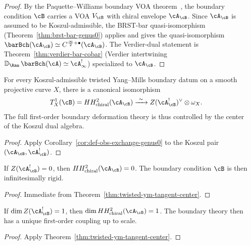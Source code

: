 \begin{proof}
By the Paquette--Williams boundary VOA theorem~{\cite{PW22}}, the boundary condition $\cB$ carries a
VOA $V_{\cB}$ with chiral envelope $\cA_{\cB}$. Since $\cA_{\cB}$ is assumed to be
Koszul-admissible, the BRST-bar quasi-isomorphism (Theorem~\ref{thm:brst-bar-genus0}) applies and gives the quasi-isomorphism
$\barBch(\cA_{\cB}) \simeq C^{\frac{\infty}{2}+\bullet}(\cA_{\cB})$. The Verdier-dual statement is
Theorem~\ref{thm:verdier-bar-cobar} (Verdier intertwining $\mathbb{D}_{\Ran}\, \barBch(\cA) \simeq \cA^!_\infty$) specialized to $\cA_{\cB}$.
\end{proof}

\begin{theorem}
\label{thm:twisted-ym-tangent-center}
For every Koszul-admissible twisted Yang--Mills boundary datum on a smooth projective
curve $X$, there is a canonical isomorphism
\[
T^1_X(\cB)
= HH^2_{\mathrm{chiral}}(\cA_{\cB})
\xrightarrow{\ \sim\ }
Z(\cA_{\cB}^!)^{\vee} \otimes \omega_X.
\]
The full first-order boundary deformation theory is thus controlled by the center
of the Koszul dual algebra.
\end{theorem}

\begin{proof}
Apply Corollary~\ref{cor:def-obs-exchange-genus0} to the Koszul pair
$(\cA_{\cB}, \cA_{\cB}^!)$.
\end{proof}

\begin{corollary}
\label{cor:twisted-ym-center-rigidity}
If $Z(\cA_{\cB}^!) = 0$, then $HH^2_{\mathrm{chiral}}(\cA_{\cB}) = 0$.
The boundary condition $\cB$ is then infinitesimally rigid.
\end{corollary}

\begin{proof}
Immediate from Theorem~\ref{thm:twisted-ym-tangent-center}.
\end{proof}

\begin{corollary}
\label{cor:twisted-ym-one-parameter}
If $\dim Z(\cA_{\cB}^!) = 1$, then $\dim HH^2_{\mathrm{chiral}}(\cA_{\cB}) = 1$.
The boundary theory then has a unique first-order coupling up to scale.
\end{corollary}

\begin{proof}
Apply Theorem~\ref{thm:twisted-ym-tangent-center}.
\end{proof}


